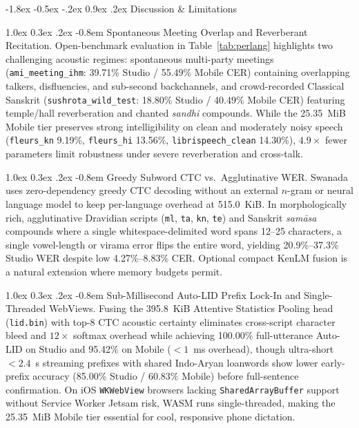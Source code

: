\documentclass[10pt,twocolumn]{article}
\makeatletter
\renewcommand\section{\@startsection {section}{1}{\z@}%
  {-1.8ex \@plus -0.5ex \@minus -.2ex}%
  {0.9ex \@plus.2ex}%
  {\normalfont\large\bfseries}}
\renewcommand\paragraph{\@startsection{paragraph}{4}{\z@}%
  {1.0ex \@plus0.3ex \@minus.2ex}%
  {-0.8em}%
  {\normalfont\normalsize\bfseries}}
\makeatother
\begin{document}
\section{Discussion \& Limitations}
\label{sec:discussion}

\paragraph{Spontaneous Meeting Overlap and Reverberant Recitation.}
Open-benchmark evaluation in Table~\ref{tab:perlang} highlights two challenging acoustic regimes: spontaneous multi-party meetings (\texttt{ami\_meeting\_ihm}: 39.71\% Studio / 55.49\% Mobile CER) containing overlapping talkers, disfluencies, and sub-second backchannels, and crowd-recorded Classical Sanskrit (\texttt{sushrota\_wild\_test}: 18.80\% Studio / 40.49\% Mobile CER) featuring temple/hall reverberation and chanted \emph{sandhi} compounds. While the 25.35~MiB Mobile tier preserves strong intelligibility on clean and moderately noisy speech (\texttt{fleurs\_kn} 9.19\%, \texttt{fleurs\_hi} 13.56\%, \texttt{librispeech\_clean} 14.30\%), $4.9\times$ fewer parameters limit robustness under severe reverberation and cross-talk.

\paragraph{Greedy Subword CTC vs.\ Agglutinative WER.}
Swanada uses zero-dependency greedy CTC decoding without an external $n$-gram or neural language model to keep per-language overhead at 515.0~KiB. In morphologically rich, agglutinative Dravidian scripts (\texttt{ml}, \texttt{ta}, \texttt{kn}, \texttt{te}) and Sanskrit \emph{sam\=asa} compounds where a single whitespace-delimited word spans 12--25 characters, a single vowel-length or virama error flips the entire word, yielding 20.9\%--37.3\% Studio WER despite low 4.27\%--8.83\% CER. Optional compact KenLM fusion is a natural extension where memory budgets permit.

\paragraph{Sub-Millisecond Auto-LID Prefix Lock-In and Single-Threaded WebViews.}
Fusing the 395.8~KiB Attentive Statistics Pooling head (\texttt{lid.bin}) with top-8 CTC acoustic certainty eliminates cross-script character bleed and $12\times$ softmax overhead while achieving 100.00\% full-utterance Auto-LID on Studio and 95.42\% on Mobile ($< 1$~ms overhead), though ultra-short $< 2.4$~s streaming prefixes with shared Indo-Aryan loanwords show lower early-prefix accuracy (85.00\% Studio / 60.83\% Mobile) before full-sentence confirmation. On iOS \texttt{WKWebView} browsers lacking \texttt{SharedArrayBuffer} support without Service Worker Jetsam risk, WASM runs single-threaded, making the 25.35~MiB Mobile tier essential for cool, responsive phone dictation.
\end{document}
